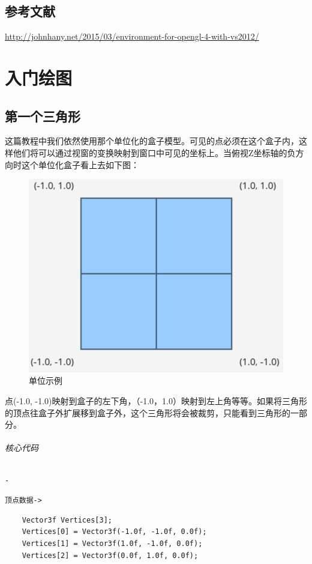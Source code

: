 \documentclass[UTF8,a4paper,8pt]{ctexbook}
\begin{document}
    \section{参考文献} 
    \url{http://johnhany.net/2015/03/environment-for-opengl-4-with-vs2012/}    

\newpage
\chapter{入门绘图}
	\section{第一个三角形}
		这篇教程中我们依然使用那个单位化的盒子模型。可见的点必须在这个盒子内，这样他们将可以通过视窗的变换映射到窗口中可见的坐标上。当俯视Z坐标轴的负方向时这个单位化盒子看上去如下图：
			\begin{figure}[htbp]
				\begin{center}
					\includegraphics[scale = 0.5]{unitPic.png}
					\caption{单位示例}
				\end{center}
			\end{figure}
			
		点(-1.0, -1.0)映射到盒子的左下角，（-1.0，1.0）映射到左上角等等。如果将三角形的顶点往盒子外扩展移到盒子外，这个三角形将会被裁剪，只能看到三角形的一部分。
    
    
	   \subparagraph{核心代码}\verb|-|
	   
		  \verb|顶点数据->|  
		  \begin{lstlisting}
	Vector3f Vertices[3]; 
	Vertices[0] = Vector3f(-1.0f, -1.0f, 0.0f); 
	Vertices[1] = Vector3f(1.0f, -1.0f, 0.0f); 
	Vertices[2] = Vector3f(0.0f, 1.0f, 0.0f); 
		  \end{lstlisting} 
		  
\end{document}
